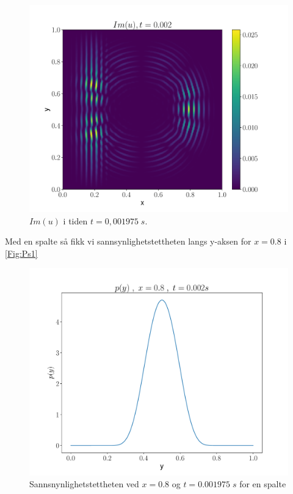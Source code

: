 \documentclass[reprint,english,notitlepage]{revtex4-2}  %
\begin{document}
\begin{figure}[H]
	\centering
	\includegraphics[scale=0.45, trim={3cm 0 0 0}]{../Images/ImshowIm0002sl2.pdf}
	\caption{$Im(u) $ i tiden $t = 0,001975 \; s$.}
	\label{Fig:s2Imt02}
\end{figure}

Med en spalte så fikk vi sannsynlighetstettheten langs y-aksen for $x = 0.8$ i \autoref{Fig:Ps1}

\begin{figure}[H]
	\centering
	\includegraphics[scale=0.4]{../Images/ScreenProb1Slit.pdf}
	\caption{Sannsnynlighetstettheten ved $x = 0.8$ og $t = 0.001975 \; s$ for en spalte}
	\label{Fig:Ps1}
\end{figure}
\end{document}
